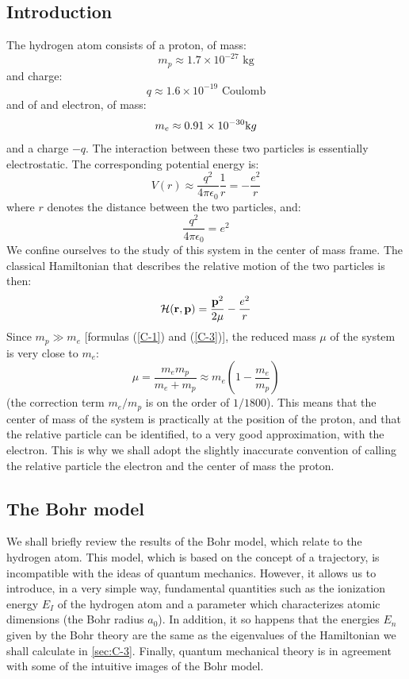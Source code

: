 \subsection{Introduction}
The hydrogen atom consists of a proton, of mass:
\begin{equation}\label{C-1}
	m_p\approx 1.7\times 10^{-27} \mbox{ kg}
\end{equation}
and charge:
\begin{equation}\label{C-2}
	q\approx 1.6\times 10^{-19} \mbox{ Coulomb}
\end{equation}
and of and electron, of mass:
\begin{equation}\label{C-3}
	m_e\approx 0.91\times 10^{-30}\mbox kg
\end{equation}
and a charge $-q$. The interaction between these two particles is essentially electrostatic. The corresponding potential energy is:
\begin{equation}\label{C-4}
	V(r)\approx \frac{q^2}{4\pi\epsilon_0}\frac{1}{r}=-\frac{e^2}{r}
\end{equation}
where $r$ denotes the distance between the two particles, and:
\begin{equation}\label{C-5}
	\frac{q^2}{4\pi\epsilon_0}=e^2
\end{equation}
We confine ourselves to the study of this system in the center of mass frame. The classical Hamiltonian that describes the relative motion of the two particles is then:
\begin{equation}\label{C-6}
	\mathcal{H}(\vb{r},\vb{p})=\frac{\vb{p}^2}{2\mu}-\frac{e^2}{r}
\end{equation}
Since $m_p \gg m_e$ [formulas (\ref{C-1}) and (\ref{C-3})], the reduced mass $\mu$ of the system is very close to $m_e$:
\begin{equation}\label{C-7}
	\mu=\frac{m_em_p}{m_e+m_p}\approx m_e\left(1-\frac{m_e}{m_p}\right)
\end{equation}
(the correction term $m_e/m_p$ is on the order of $1/1800$).  This means that the center of mass of the system is practically at the position of the proton, and that the relative particle can be identified, to a very good approximation, with the electron. This is why we shall adopt the slightly inaccurate convention of calling the relative particle the electron and the center of mass the proton.

\subsection{The Bohr model}
We shall briefly review the results of the Bohr model, which relate to the hydrogen atom. This model, which is based on the concept of a trajectory, is incompatible with the ideas of quantum mechanics. However, it allows us to introduce, in a very simple way, fundamental quantities such as the ionization energy $E_I$ of the hydrogen atom and a parameter which characterizes atomic dimensions (the Bohr radius $a_0$). In addition, it so happens that the energies $E_n$ given by the Bohr theory are the same as the eigenvalues of the Hamiltonian we shall calculate in \ref{sec:C-3}. Finally, quantum mechanical theory is in agreement with some of the intuitive images of the Bohr model.

